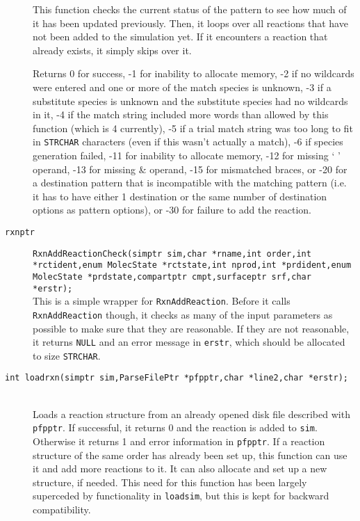 \documentclass {book}
\begin{document}
\begin{description}
This function checks the current status of the pattern to see how much of it has been updated previously. Then, it loops over all reactions that have not been added to the simulation yet. If it encounters a reaction that already exists, it simply skips over it.

Returns 0 for success, -1 for inability to allocate memory, -2 if no wildcards were entered and one or more of the match species is unknown, -3 if a substitute species is unknown and the substitute species had no wildcards in it, -4 if the match string included more words than allowed by this function (which is 4 currently), -5 if a trial match string was too long to fit in \texttt{STRCHAR} characters (even if this wasn't actually a match), -6 if species generation failed, -11 for inability to allocate memory, -12 for missing ` ' operand, -13 for missing \& operand, -15 for mismatched braces, or -20 for a destination pattern that is incompatible with the matching pattern (i.e. it has to have either 1 destination or the same number of destination options as pattern options), or -30 for failure to add the reaction.

\item[\texttt{rxnptr}]
\texttt{RxnAddReactionCheck(simptr sim,char *rname,int order,int *rctident,enum MolecState *rctstate,int nprod,int *prdident,enum MolecState *prdstate,compartptr cmpt,surfaceptr srf,char *erstr);} \\
This is a simple wrapper for \texttt{RxnAddReaction}. Before it calls \texttt{RxnAddReaction} though, it checks as many of the input parameters as possible to make sure that they are reasonable. If they are not reasonable, it returns \texttt{NULL} and an error message in \texttt{erstr}, which should be allocated to size \texttt{STRCHAR}.

\item[\texttt{int loadrxn(simptr sim,ParseFilePtr *pfpptr,char *line2,char *erstr);}]
\hfill \\
Loads a reaction structure from an already opened disk file described with \texttt{pfpptr}. If successful, it returns 0 and the reaction is added to \texttt{sim}. Otherwise it returns 1 and error information in \texttt{pfpptr}. If a reaction structure of the same order has already been set up, this function can use it and add more reactions to it. It can also allocate and set up a new structure, if needed. This need for this function has been largely superceded by functionality in \texttt{loadsim}, but this is kept for backward compatibility.


\end{description}
\end{document}
